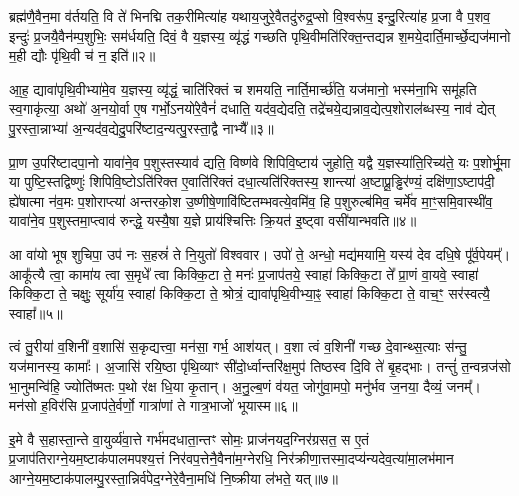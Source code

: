 ब्रह्म॑णै॒वैन॒मा व॑र्तयति॒ वि ते॑ भिनद्मि तक॒रीमित्या॑ह यथाय॒जुरे॒वैतदु॑रुद्र॒प्सो वि॒श्वरू॑प॒ इन्दु॒रित्या॑ह प्र॒जा वै प॒शव॒ इन्दुः॑ प्र॒जयै॒वैन॑म्प॒शुभिः॒ सम॑र्धयति॒ दिवं॒ वै य॒ज्ञस्य॒ व्यृ॑द्धं गच्छति पृथि॒वीमति॑रिक्त॒न्तद्यन्न श॒मये॒दार्ति॒मार्च्छे॒द्यज॑मानो म॒ही द्यौः पृ॑थि॒वी च॑ न॒ इति॑॥२॥

आ॒ह॒ द्यावा॑पृथि॒वीभ्या॑मे॒व य॒ज्ञस्य॒ व्यृ॑द्धं॒ चाति॑रिक्तं च शमयति॒ नार्ति॒मार्च्छ॑ति॒ यज॑मानो॒ भस्म॑ना॒भि समू॑हति स्व॒गाकृ॑त्या॒ अथो॑ अ॒नयो॒र्वा ए॒ष गर्भो॒\-ऽनयो॑रे॒वैनं॑ दधाति॒ यद॑व॒द्येदति॒ तद्रे॑चये॒द्यन्नाव॒द्येत्प॒शोराल॑ब्धस्य॒ नाव॑ द्येत् पु॒रस्ता॒न्नाभ्या॑ अ॒न्यद॑व॒द्येदु॒परि॑ष्टाद॒न्यत्पु॒रस्ता॒द्वै नाभ्यै᳚॥३॥

प्रा॒ण उ॒परि॑ष्टादपा॒नो यावा॑ने॒व प॒शुस्तस्याव॑ द्यति॒ विष्ण॑वे शिपिवि॒ष्टाय॑ जुहोति॒ यद्वै य॒ज्ञस्या॑ति॒रिच्य॑ते॒ यः प॒शोर्भू॒मा या पुष्टि॒स्तद्विष्णुः॑ शिपिवि॒ष्टो\-ऽति॑रिक्त ए॒वाति॑रिक्तं दधा॒त्यति॑रिक्तस्य॒ शान्त्या॑ अ॒ष्टाप्रू॒ड्ढिर॑ण्यं॒ दक्षि॑णा॒\-ऽष्टाप॑दी॒ ह्ये॑षात्मा न॑व॒मः प॒शोराप्त्या॑ अन्तरको॒श उ॒ष्णीषे॒णावि॑ष्टितम्भवत्ये॒वमि॑व॒ हि प॒शुरुल्ब॑मिव॒ चर्मे॑व मा॒ꣳ॒समि॒वास्थी॑व॒ यावा॑ने॒व प॒शुस्तमा॒प्त्वाव॑ रुन्द्धे॒ यस्यै॒षा य॒ज्ञे प्राय॑श्चित्तिः क्रि॒यत॑ इ॒ष्ट्वा वसी॑यान्भवति॥४॥

{\anuvakamend[{व॒र्त॒येत्या॑ह न॒ इति॒ वै नाभ्या॒ उल्ब॑मि॒वैक॑विꣳशतिश्च॥१॥}]}

आ वा॑यो भूष शुचिपा॒ उप॑ नः स॒हस्रं॑ ते नि॒युतो॑ विश्ववार। उपो॑ ते॒ अन्धो॒ मद्य॑मयामि॒ यस्य॑ देव दधि॒षे पू᳚र्व॒पेयम्᳚। आकू᳚त्यै त्वा॒ कामा॑य त्वा स॒मृधे᳚ त्वा किक्कि॒टा ते॒ मनः॑ प्र॒जाप॑तये॒ स्वाहा॑ किक्कि॒टा ते᳚ प्रा॒णं वा॒यवे॒ स्वाहा॑ किक्कि॒टा ते॒ चक्षुः॒ सूर्या॑य॒ स्वाहा॑ किक्कि॒टा ते॒ श्रोत्रं॒ द्यावा॑पृथि॒वीभ्या॒ꣴ॒ स्वाहा॑ किक्कि॒टा ते॒ वाच॒ꣳ॒ सर॑स्वत्यै॒ स्वाहा᳚॥५॥

त्वं तु॒रीया॑ व॒शिनी॑ व॒शासि॑ स॒कृद्यत्त्वा॒ मन॑सा॒ गर्भ॒ आश॑यत्। व॒शा त्वं व॒शिनी॑ गच्छ दे॒वान्थ्स॒त्याः स॑न्तु॒ यज॑मानस्य॒ कामाः᳚। अ॒जासि॑ रयि॒ष्ठा पृ॑थि॒व्याꣳ सी॑दो॒र्ध्वान्तरि॑क्ष॒मुप॑ तिष्ठस्व दि॒वि ते॑ बृ॒हद्भाः। तन्तुं॑ त॒न्वन्रज॑सो भा॒नुमन्वि॑हि॒ ज्योति॑ष्मतः प॒थो र॑क्ष धि॒या कृ॒तान्। अ॒नु॒ल्ब॒णं व॑यत॒ जोगु॑वा॒मपो॒ मनु॑र्भव ज॒नया॒ दैव्यं॒ जनम्᳚। मन॑सो ह॒विर॑सि प्र॒जाप॑ते॒र्वर्णो॒ गात्रा॑णां ते गात्र॒भाजो॑ भूयास्म॥६॥

{\anuvakamend[{सर॑स्वत्यै॒ स्वाहा॒ मनु॒स्त्रयो॑दश च॥२॥}]}

इ॒मे वै स॒हास्ता॒न्ते वा॒युर्व्य॑वा॒त्ते गर्भ॑मदधाता॒न्तꣳ सोमः॒ प्राज॑नयद॒ग्निर॑ग्रसत॒ स ए॒तं प्र॒जाप॑तिराग्ने॒यम॒ष्टाक॑पाल\-मपश्य॒त्तं निर॑वप॒त्तेनै॒वैना॑म॒ग्नेरधि॒ निर॑क्रीणा॒त्तस्मा॒दप्य॑न्यदेव॒त्या॑मा॒लभ॑मान आग्ने॒यम॒ष्टाक॑पालम्पु॒रस्ता॒न्निर्व॑पेद॒ग्ने\-रे॒वैना॒मधि॑ नि॒ष्क्रीया ल॑भते॒ यत्॥७॥

